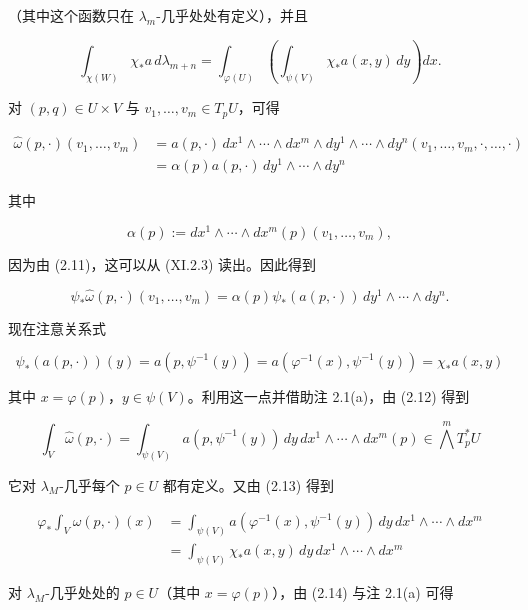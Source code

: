\begin{theorem}
\begin{items}
（其中这个函数只在 $ \lambda_m $-几乎处处有定义），并且

\begin{equation}
\int_{\chi(W)} \chi_* a \, d\lambda_{m+n} = \int_{\varphi(U)} \left( \int_{\psi(V)} \chi_* a(x,y) \, dy \right) dx .\tag{2.14}
\end{equation}

对 $ (p,q) \in U \times V $ 与 $ v_1, \dots, v_m \in T_p U $，可得

\begin{equation*}
\begin{aligned}
\widehat{\omega}(p,\cdot)(v_1, \dots, v_m) &= a(p,\cdot) \, dx^1 \wedge \cdots \wedge dx^m \wedge dy^1 \wedge \cdots \wedge dy^n (v_1, \dots, v_m, \cdot, \dots, \cdot) \\ &= \alpha(p) a(p,\cdot) \, dy^1 \wedge \cdots \wedge dy^n
\end{aligned}
\end{equation*}

其中

\[
\alpha(p) := dx^1 \wedge \cdots \wedge dx^m(p)(v_1, \dots, v_m) ,
\]

因为由 (2.11)，这可以从 (XI.2.3) 读出。因此得到

\[
\psi_* \widehat{\omega}(p,\cdot)(v_1, \dots, v_m) = \alpha(p)\psi_*(a(p,\cdot)) \, dy^1 \wedge \cdots \wedge dy^n .
\]

现在注意关系式

\[
\psi_*(a(p,\cdot))(y) = a(p, \psi^{-1}(y)) = a(\varphi^{-1}(x), \psi^{-1}(y)) = \chi_* a(x,y)
\]

其中 $ x = \varphi(p) $，$ y \in \psi(V) $。利用这一点并借助注 2.1(a)，由 (2.12) 得到

\[
\int_V \widehat{\omega}(p,\cdot) = \int_{\psi(V)} a(p, \psi^{-1}(y)) \, dy \, dx^1 \wedge \cdots \wedge dx^m (p) \in \bigwedge^m T_p^* U
\]

它对 $ \lambda_M $-几乎每个 $ p \in U $ 都有定义。又由 (2.13) 得到

\begin{equation*}
\begin{aligned}
\varphi_* \int_V \widehat{\omega}(p,\cdot)(x) &= \int_{\psi(V)} a(\varphi^{-1}(x), \psi^{-1}(y)) \, dy \, dx^1 \wedge \cdots \wedge dx^m \\ &= \int_{\psi(V)} \chi_* a(x,y) \, dy \, dx^1 \wedge \cdots \wedge dx^m
\end{aligned}
\end{equation*}

对 $ \lambda_M $-几乎处处的 $ p \in U $（其中 $ x = \varphi(p) $），由 (2.14) 与注 2.1(a) 可得


\end{items}
\end{theorem}
